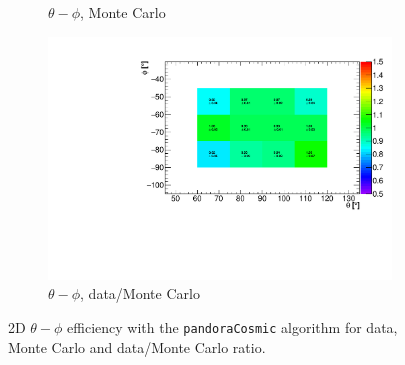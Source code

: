 \documentclass[a4paper]{scrartcl}
\begin{document}
\begin{figure}[htbp]
\begin{center}
\begin{subfigure}{0.52\textwidth}
\caption{$\theta - \phi$, Monte Carlo}\label{fig:2d_cry_mc}
\end{subfigure}
\begin{subfigure}{0.52\textwidth}
\includegraphics[width=\linewidth]{figures/ratio_theta_phi.pdf}
\caption{$\theta - \phi$, data/Monte Carlo}\label{fig:2d_cry_ratio}
\end{subfigure}
\caption{2D $\theta - \phi$ efficiency with the \texttt{pandoraCosmic} algorithm for data, Monte Carlo and data/Monte Carlo ratio.} \label{fig:cry_mc_2d}
\end{center}
\end{figure}
\end{document}
